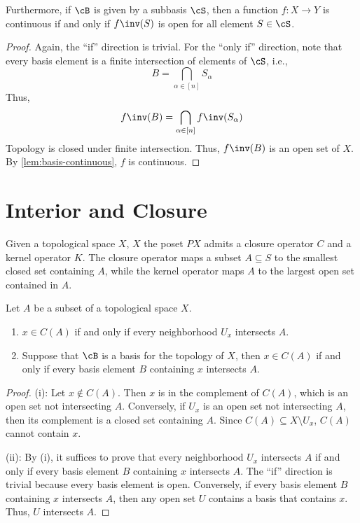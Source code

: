 \documentclass{amsart}
\begin{document}
\begin{lem}
  Furthermore, if $\cB$ is given by a subbasis $\cS$, then a function $f : X \to Y$ is continuous if and only if $f\inv(S)$ is open for all element $S \in \cS$.
\end{lem}
\begin{proof}
  Again, the ``if'' direction is trivial.
  For the ``only if'' direction, note that every basis element is a finite intersection of elements of $\cS$, i.e.,
  \[
    B = \bigcap_{\alpha \in [n]} S_{\alpha}
  \]
  Thus,
  \[
    f\inv(B) = \bigcap_{\alpha \in [n]}f\inv(S_{\alpha})
  \]
  Topology is closed under finite intersection.
  Thus, $f\inv(B)$ is an open set of $X$.
  By \cref{lem:basis-continuous}, $f$ is continuous.
\end{proof}

\section{Interior and Closure}
\label{sec:interior-and-closure}

Given a topological space $X$, $X$ the poset $PX$ admits a closure operator $C$ and a kernel operator $K$.
The closure operator maps a subset $A \subseteq S$ to the smallest closed set containing $A$, while the kernel operator maps $A$ to the largest open set contained in $A$.

\begin{lem}
  Let $A$ be a subset of a topological space $X$.
  \begin{enumerate}
  \item $x \in C(A)$ if and only if every neighborhood $U_{x}$ intersects $A$.
  \item Suppose that $\cB$ is a basis for the topology of $X$, then $x \in C(A)$ if and only if every basis element $B$ containing $x$ intersects $A$.
  \end{enumerate}
\end{lem}
\begin{proof}
  (i): Let $x \notin C(A)$.
  Then $x$ is in the complement of $C(A)$, which is an open set not intersecting $A$.
  Conversely, if $U_{x}$ is an open set not intersecting $A$, then its complement is a closed set containing $A$.
  Since $C(A) \subseteq X \setminus U_{x}$, $C(A)$ cannot contain $x$.

  (ii): By (i), it suffices to prove that every neighborhood $U_{x}$ intersects $A$ if and only if every basis element $B$ containing $x$ intersects $A$.
  The ``if'' direction is trivial because every basis element is open.
  Conversely, if every basis element $B$ containing $x$ intersects $A$, then any open set $U$ contains a basis that contains $x$.
  Thus, $U$ intersects $A$.
\end{proof}
\end{document}
